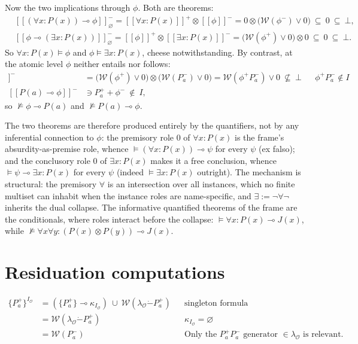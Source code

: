 \documentclass{article}
\theoremstyle{definition}
\newcommand{\cO}{\mathcal{O}}
\newcommand{\cW}{\mathcal{W}}
\newcommand{\bbrack}[1]{[\![ #1 ]\!]}
\newcommand{\monus}{\mathbin{\dot-}}
\begin{document}
Now the two implications through $\phi$. Both are theorems:
\begin{align*}
&\bbrack{(\forall x\colon P(x))\multimap\phi}^-_\varnothing
 =\bbrack{\forall x\colon P(x)}^+\otimes\bbrack{\phi}^-
 =0\otimes\bigl(\cW(\phi^-)\vee 0\bigr)
 \ \subseteq\ 0\ \subseteq\ \bot,\\
&\bbrack{\phi\multimap(\exists x\colon P(x))}^-_\varnothing
 =\bbrack{\phi}^+\otimes\bbrack{\exists x\colon P(x)}^-
 =\bigl(\cW(\phi^+)\vee 0\bigr)\otimes 0
 \ \subseteq\ 0\ \subseteq\ \bot.
\end{align*}
So $\forall x\colon P(x)\vDash\phi$ and
$\phi\vDash\exists x\colon P(x)$, cheese notwithstanding. By contrast, at
the atomic level $\phi$ neither entails nor follows:
\begin{align*}
\bbrack{\phi\multimap P(a)}^-
&=\bigl(\cW(\phi^+)\vee 0\bigr)\otimes\bigl(\cW(P^-_a)\vee 0\bigr)
 =\cW(\phi^+P^-_a)\vee 0\ \not\subseteq\ \bot
  && \phi^+P^-_a\notin I\\
\bbrack{P(a)\multimap\phi}^-
&\ni P^+_a+\phi^-\ \notin\ I,
\end{align*}
so $\nvDash\phi\multimap P(a)$ and $\nvDash P(a)\multimap\phi$.

The two theorems are therefore produced entirely by the quantifiers, not
by any inferential connection to $\phi$: the premisory role $0$ of
$\forall x\colon P(x)$ is the frame's absurdity-as-premise role, whence
$\vDash(\forall x\colon P(x))\multimap\psi$ for every $\psi$ (ex falso);
and the conclusory role $0$ of $\exists x\colon P(x)$ makes it a free
conclusion, whence $\vDash\psi\multimap\exists x\colon P(x)$ for every
$\psi$ (indeed $\vDash\exists x\colon P(x)$ outright). The mechanism is
structural: the premisory $\forall$ is an intersection over all
instances, which no finite multiset can inhabit when the instance roles
are name-specific, and $\exists:=\neg\forall\neg$ inherits the dual
collapse. The informative quantified theorems of the frame are the
conditionals, where roles interact before the collapse:
$\vDash\forall x\colon P(x)\multimap J(x)$, while
$\nvDash\forall x\forall y\colon(P(x)\otimes P(y))\multimap J(x)$.


\pagebreak 

\section{Residuation computations}
\label{sec:botcompex}


\begin{align*}
\{P^+_a\}^{I_\cO}
&=(\{P^+_a\}\multimap\kappa_{I_\cO})\ \cup\ \cW(\lambda_\cO\monus P^+_a)
  && \text{singleton formula}\\
&=\cW(\lambda_\cO\monus P^+_a)
  && \kappa_{I_\cO}=\varnothing\\
&=\cW(P^-_a)
  && \text{Only the } P^+_aP^-_a \text{ generator }\in \lambda_{\cO}\text{ is relevant}.
\end{align*}
\end{document}
